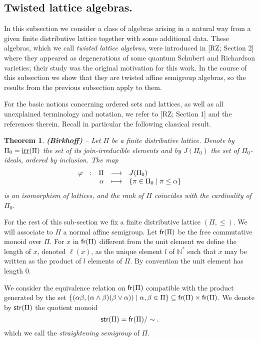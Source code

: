 \documentclass[twoside,11pt]{article}
\newcommand{\join}{\vee}
\newcommand{\meet}{\wedge}
\newcommand{\N}{{\mathbb N}}
\newcommand{\irr}{\underline{{\rm irr}}}
\newcommand{\FrMon}{{\sf fr}}
\newcommand{\StMon}{{\sf str}}
\newtheorem{subtheorem}{Theorem}[subsection]
\begin{document}
\subsection{Twisted lattice algebras.}\label{ss-tla}

In this subsection we consider a class of algebras arising in a natural way from a given
finite distributive lattice together with some additional data. These algebras, which we
call \emph{twisted lattice algebras}, were introduced in [RZ; Section 2] where they
appeared as degenerations of some quantum Schubert and Richardson varieties; their study
was the original motivation for this work. In the course of this subsection we show that
they are twisted affine semigroup algebras, so the results from the previous subsection
apply to them.

For the basic notions concerning ordered sets and lattices, as well as all unexplained
terminology and notation, we refer to [RZ; Section 1] and the references therein. Recall
in particular the following classical result.

\begin{subtheorem} {\bf (Birkhoff)} -- \label{birkhoff}
Let $\Pi$ be a finite distributive lattice. Denote by $\Pi_0=\irr(\Pi)$ the set of its
join-irreducible elements and by $J(\Pi_0)$ the set of $\Pi_0$-ideals, ordered
by inclusion. The map
\[
\begin{array}{ccrcl}
\varphi & : & \Pi & \longrightarrow & J(\Pi_0) \cr
 & & \alpha & \longmapsto & \{\pi\in\Pi_0 \mid \pi\le\alpha\}   
\end{array}
\]
is an isomorphism of lattices, and the rank of $\Pi$ coincides with the cardinality of
$\Pi_0$.
\end{subtheorem}

For the rest of this sub-section we fix a finite distributive lattice $(\Pi, \leq)$. We
will associate to $\Pi$ a normal affine semigroup.
Let $\FrMon(\Pi)$ be the free commutative monoid over $\Pi$. For $x$ in $\FrMon(\Pi)$
different from the unit element we define the length of $x$, denoted $\ell(x)$, as the
unique element $l$ of $\N^*$ such that $x$ may be written as the product of $l$ elements
of $\Pi$. By convention the unit element has length $0$.

We consider the equivalence relation on $\FrMon(\Pi)$ compatible with the product
generated by the set $\{(\alpha\beta,(\alpha\meet\beta)(\beta\join\alpha)) \mid
\alpha,\beta\in\Pi\} \subseteq \FrMon(\Pi) \times \FrMon(\Pi)$. We denote by $\StMon(\Pi)$
the quotient monoid
\[
\StMon(\Pi) = \FrMon(\Pi)/\sim .
\]
which we call the \emph{straightening semigroup} of $\Pi$.
\end{document}
